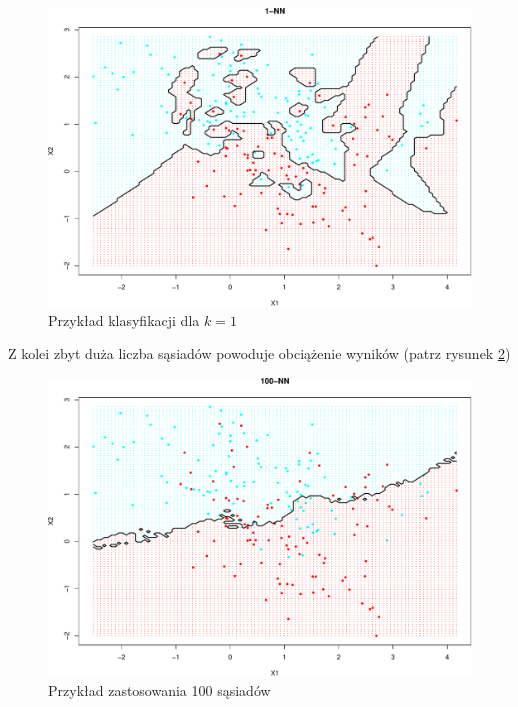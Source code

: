 \documentclass[
]{book}
\theoremstyle{plain}
\theoremstyle{definition}
\theoremstyle{definition}
\theoremstyle{definition}
\theoremstyle{definition}
\theoremstyle{definition}
\theoremstyle{remark}
\begin{document}
\begin{figure}

{\centering \includegraphics{EksploracjaDanych_files/figure-latex/knn1-1} 

}

\caption{Przykład klasyfikacji dla $k=1$}\label{fig:knn1}
\end{figure}

Z kolei zbyt duża liczba sąsiadów powoduje obciążenie wyników (patrz rysunek \ref{fig:knn2})

\begin{figure}

{\centering \includegraphics{EksploracjaDanych_files/figure-latex/knn2-1} 

}

\caption{Przykład zastosowania 100 sąsiadów}\label{fig:knn2}
\end{figure}
\end{document}
